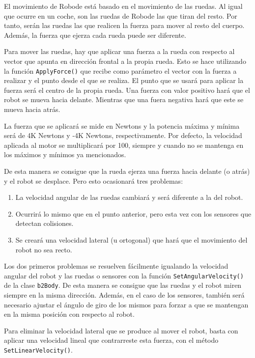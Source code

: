 El movimiento de Robode está basado en el movimiento de las ruedas. Al igual que ocurre en un coche, son las ruedas de Robode las que tiran del resto. Por tanto, serán las ruedas las que realicen la fuerza para mover al resto del cuerpo. Además, la fuerza que ejerza cada rueda puede ser diferente. 

Para mover las ruedas, hay que aplicar una fuerza a la rueda con respecto al vector que apunta en dirección frontal a la propia rueda. Esto se hace utilizando la función \texttt{ApplyForce()} que recibe como parámetro el vector con la fuerza a realizar y el punto desde el que se realiza. El punto que se usará para aplicar la fuerza será el centro de la propia rueda. Una fuerza con valor positivo hará que el robot se mueva hacia delante. Mientras que una fuera negativa hará que este se mueva hacia atrás.

La fuerza que se aplicará se mide en Newtons y la potencia máxima y mínima será de 4K Newtons y -4K Newtons, respectivamente. Por defecto, la velocidad aplicada al motor se multiplicará por 100, siempre y cuando no se mantenga en los máximos y mínimos ya mencionados.

De esta manera se consigue que la rueda ejerza una fuerza hacia delante (o atrás) y el robot se desplace. Pero esto ocasionará tres problemas: 

\begin{enumerate}
	\item La velocidad angular de las ruedas cambiará y será diferente a la del robot.
	\item Ocurrirá lo mismo que en el punto anterior, pero esta vez con los sensores que detectan colisiones.
	\item Se creará una velocidad lateral (u ortogonal) que hará que el movimiento del robot no sea recto.
\end{enumerate} 

Los dos primeros problemas se resuelven fácilmente igualando la velocidad angular del robot y las ruedas o sensores con la función \texttt{SetAngularVelocity()} de la clase \texttt{b2Body}. De esta manera se consigue que las ruedas y el robot miren siempre en la misma dirección. Además, en el caso de los sensores, también será necesario ajustar el ángulo de giro de los mismos para forzar a que se mantengan en la misma posición con respecto al robot.

Para eliminar la velocidad lateral que se produce al mover el robot, basta con aplicar una velocidad lineal que contrarreste esta fuerza, con el método \texttt{SetLinearVelocity()}. 

